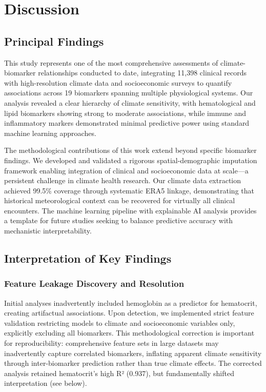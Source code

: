 \section{Discussion}

\subsection{Principal Findings}

This study represents one of the most comprehensive assessments of climate-biomarker relationships conducted to date, integrating 11,398 clinical records with high-resolution climate data and socioeconomic surveys to quantify associations across 19 biomarkers spanning multiple physiological systems. Our analysis revealed a clear hierarchy of climate sensitivity, with hematological and lipid biomarkers showing strong to moderate associations, while immune and inflammatory markers demonstrated minimal predictive power using standard machine learning approaches.

The methodological contributions of this work extend beyond specific biomarker findings. We developed and validated a rigorous spatial-demographic imputation framework enabling integration of clinical and socioeconomic data at scale---a persistent challenge in climate health research. Our climate data extraction achieved 99.5\% coverage through systematic ERA5 linkage, demonstrating that historical meteorological context can be recovered for virtually all clinical encounters. The machine learning pipeline with explainable AI analysis provides a template for future studies seeking to balance predictive accuracy with mechanistic interpretability.

\subsection{Interpretation of Key Findings}

\subsubsection{Feature Leakage Discovery and Resolution}

Initial analyses inadvertently included hemoglobin as a predictor for hematocrit, creating artifactual associations. Upon detection, we implemented strict feature validation restricting models to climate and socioeconomic variables only, explicitly excluding all biomarkers. This methodological correction is important for reproducibility: comprehensive feature sets in large datasets may inadvertently capture correlated biomarkers, inflating apparent climate sensitivity through inter-biomarker prediction rather than true climate effects. The corrected analysis retained hematocrit's high R² (0.937), but fundamentally shifted interpretation (see below).

